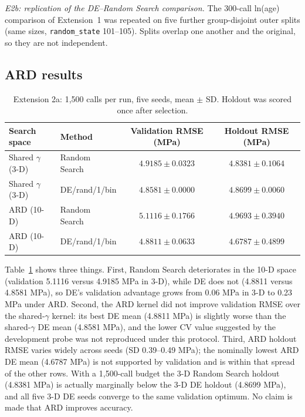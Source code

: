 \emph{E2b: replication of the DE--Random Search comparison.} The 300-call ln(age) comparison of Extension~1 was repeated on five further group-disjoint outer splits (same sizes, \texttt{random\_state} 101--105). Splits overlap one another and the original, so they are not independent.
\subsection{ARD results}
\begin{table}[htbp]\centering\footnotesize\caption{Extension 2a: 1{,}500 calls per run, five seeds, mean $\pm$ SD. Holdout was scored once after selection.}\label{tab:ext2ard}
\begin{tabular}{llcc}\toprule
Search space & Method & Validation RMSE (MPa) & Holdout RMSE (MPa)\\\midrule
Shared $\gamma$ (3-D) & Random Search & $4.9185\pm0.0323$ & $4.8381\pm0.1064$\\
Shared $\gamma$ (3-D) & DE/rand/1/bin & $4.8581\pm0.0000$ & $4.8699\pm0.0060$\\
ARD (10-D) & Random Search & $5.1116\pm0.1766$ & $4.9693\pm0.3940$\\
ARD (10-D) & DE/rand/1/bin & $4.8811\pm0.0633$ & $4.6787\pm0.4899$\\\bottomrule
\end{tabular}\end{table}
Table~\ref{tab:ext2ard} shows three things. First, Random Search deteriorates in the 10-D space (validation 5.1116 versus 4.9185 MPa in 3-D), while DE does not (4.8811 versus 4.8581 MPa), so DE's validation advantage grows from 0.06 MPa in 3-D to 0.23 MPa under ARD. Second, the ARD kernel did not improve validation RMSE over the shared-$\gamma$ kernel: its best DE mean (4.8811 MPa) is slightly worse than the shared-$\gamma$ DE mean (4.8581 MPa), and the lower CV value suggested by the development probe was not reproduced under this protocol. Third, ARD holdout RMSE varies widely across seeds (SD 0.39--0.49 MPa); the nominally lowest ARD DE mean (4.6787 MPa) is not supported by validation and is within that spread of the other rows. With a 1{,}500-call budget the 3-D Random Search holdout (4.8381 MPa) is actually marginally below the 3-D DE holdout (4.8699 MPa), and all five 3-D DE seeds converge to the same validation optimum. No claim is made that ARD improves accuracy.
